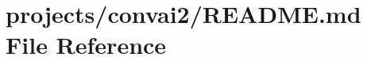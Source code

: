 \hypertarget{projects_2convai2_2README_8md}{}\section{projects/convai2/\+R\+E\+A\+D\+ME.md File Reference}
\label{projects_2convai2_2README_8md}
